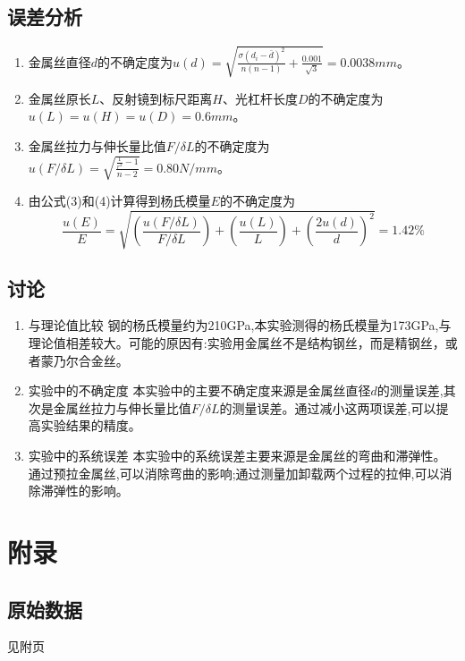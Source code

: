 \documentclass[UTF8]{ctexart}
\begin{document}
\subsection{误差分析}
\begin{enumerate}
    \item 金属丝直径$d$的不确定度为$u(d)=\sqrt{\frac{\sigma(d_i-\bar{d})^2}{n(n-1)}+\frac{0.001}{\sqrt{3}}}=0.0038mm$。
    \item 金属丝原长$L$、反射镜到标尺距离$H$、光杠杆长度$D$的不确定度为$u(L)=u(H)=u(D)=0.6mm$。
    \item 金属丝拉力与伸长量比值$F/\delta L$的不确定度为$u(F/\delta L)=\sqrt{\frac{\frac{1}{r^2}-1}{n-2}}=0.80N/mm$。
    \item 由公式(3)和(4)计算得到杨氏模量$E$的不确定度为
    \begin{equation}
    \frac{u(E)}{E}=\sqrt{(\frac{u(F/ \delta L)}{F/ \delta L})+(\frac{u(L)}{L})+(\frac{2u(d)}{d})^2}=1.42\%
    \end{equation}
\end{enumerate}
\subsection{讨论}
\begin{enumerate}
    \item 与理论值比较
    钢的杨氏模量约为210GPa,本实验测得的杨氏模量为173GPa,与理论值相差较大。可能的原因有:实验用金属丝不是结构钢丝，而是精钢丝，或者蒙乃尔合金丝。
    \item 实验中的不确定度
    本实验中的主要不确定度来源是金属丝直径$d$的测量误差,其次是金属丝拉力与伸长量比值$F/\delta L$的测量误差。通过减小这两项误差,可以提高实验结果的精度。
    \item 实验中的系统误差
    本实验中的系统误差主要来源是金属丝的弯曲和滞弹性。通过预拉金属丝,可以消除弯曲的影响;通过测量加卸载两个过程的拉伸,可以消除滞弹性的影响。
\end{enumerate}
\section{附录}
\subsection{原始数据}
见附页
\end{document}
